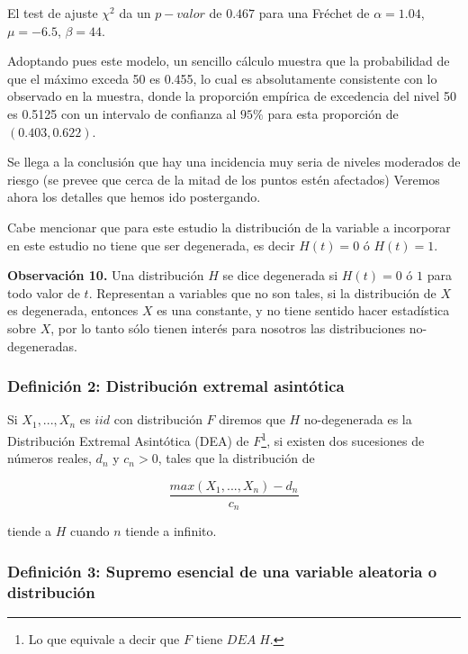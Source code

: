 \documentclass[
  oneside]{article}
\begin{document}
El test de ajuste \(\chi^2\) da un \(p-valor\) de \(0.467\) para una
Fréchet de \(\alpha=1.04\), \(\mu= -6.5\), \(\beta=44\).

Adoptando pues este modelo, un sencillo cálculo muestra que la
probabilidad de que el máximo exceda 50 es 0.455, lo cual es
absolutamente consistente con lo observado en la muestra, donde la
proporción empírica de excedencia del nivel 50 es 0.5125 con un
intervalo de confianza al \(95\%\) para esta proporción de
\((0.403, 0.622)\).

Se llega a la conclusión que hay una incidencia muy seria de niveles
moderados de riesgo (se prevee que cerca de la mitad de los puntos estén
afectados) Veremos ahora los detalles que hemos ido postergando.

Cabe mencionar que para este estudio la distribución de la variable a
incorporar en este estudio no tiene que ser degenerada, es decir
\(H(t)=0\) ó \(H(t)=1\).

\textbf{Observación 10.} Una distribución \(H\) se dice degenerada si
\(H(t)=0\) ó \(1\) para todo valor de \(t\). Representan a variables que
no son tales, si la distribución de \(X\) es degenerada, entonces \(X\)
es una constante, y no tiene sentido hacer estadística sobre \(X\), por
lo tanto sólo tienen interés para nosotros las distribuciones
no-degeneradas.

\newpage

\hypertarget{definiciuxf3n-2-distribuciuxf3n-extremal-asintuxf3tica}{%
\subsubsection{Definición 2: Distribución extremal
asintótica}\label{definiciuxf3n-2-distribuciuxf3n-extremal-asintuxf3tica}}

Si \(X_1,...,X_n\) es \(iid\) con distribución \(F\) diremos que \(H\)
no-degenerada es la Distribución Extremal Asintótica (DEA) de
\(F\)\footnote{Lo que equivale a decir que $F$ tiene $DEA\;H$.}, si
existen dos sucesiones de números reales, \(d_n\) y \(c_n>0\), tales que
la distribución de

\begin{equation}
\frac{max(X_1,...,X_n)- d_n}{c_n}\label{eq:max}
\end{equation}

tiende a \(H\) cuando \(n\) tiende a infinito.

\hypertarget{definiciuxf3n-3-supremo-esencial-de-una-variable-aleatoria-o-distribuciuxf3n}{%
\subsubsection{Definición 3: Supremo esencial de una variable aleatoria
o
distribución}\label{definiciuxf3n-3-supremo-esencial-de-una-variable-aleatoria-o-distribuciuxf3n}}
\end{document}
